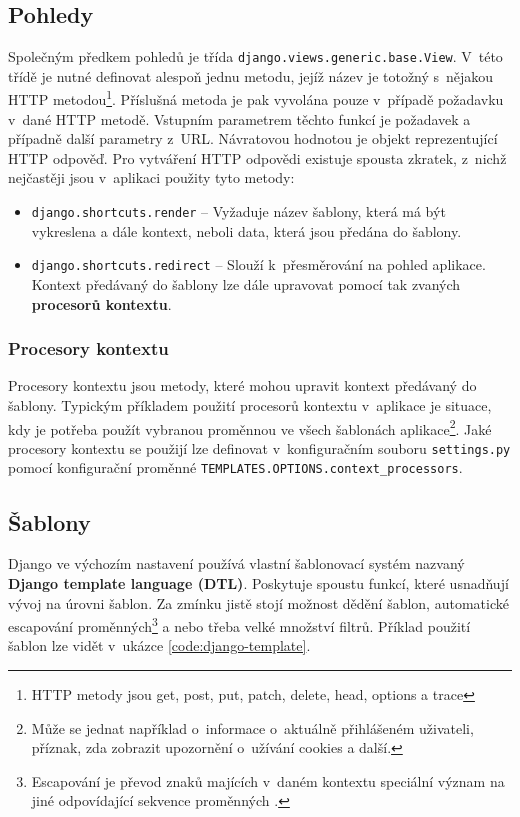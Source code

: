 \subsection{Pohledy}
Společným předkem pohledů je třída \texttt{django.views.generic.base.View}. V~této třídě je nutné definovat alespoň jednu metodu, jejíž název je totožný s~nějakou HTTP metodou\footnote{HTTP metody jsou get, post, put, patch, delete, head, options a trace}. Příslušná metoda je pak vyvolána pouze v~případě požadavku v~dané HTTP metodě. Vstupním parametrem těchto funkcí je požadavek a případně další parametry z~URL. Návratovou hodnotou je objekt reprezentující HTTP odpověď. Pro vytváření HTTP odpovědi existuje spousta zkratek, z~nichž nejčastěji jsou v~aplikaci použity tyto metody:
\begin{itemize}
    \item \texttt{django.shortcuts.render} -- Vyžaduje název šablony, která má být vykreslena a dále kontext, neboli data, která jsou předána do šablony.
    \item \texttt{django.shortcuts.redirect} -- Slouží k~přesměrování na pohled aplikace. Kontext předávaný do šablony lze dále upravovat pomocí tak zvaných \textbf{procesorů kontextu}.
\end{itemize}

\subsubsection{Procesory kontextu}
\begin{sloppypar}
Procesory kontextu jsou metody, které mohou upravit kontext předávaný do šablony. Typickým příkladem použití procesorů kontextu v~aplikace je situace, kdy je potřeba použít vybranou proměnnou ve všech šablonách aplikace\footnote{Může se jednat například o~informace o~aktuálně přihlášeném uživateli, příznak, zda zobrazit upozornění o~užívání cookies a další.}. Jaké procesory kontextu se použijí lze definovat v~konfiguračním souboru \texttt{settings.py} pomocí konfigurační proměnné \texttt{TEMPLATES.OPTIONS.context\_processors}.
\end{sloppypar}


\subsection{Šablony}
Django ve výchozím nastavení používá vlastní šablonovací systém nazvaný \textbf{Django template language (DTL)}. Poskytuje spoustu funkcí, které usnadňují vývoj na úrovni šablon. Za zmínku jistě stojí možnost dědění šablon, automatické escapování proměnných\footnote{Escapování je převod znaků majících v~daném kontextu speciální význam na jiné odpovídající sekvence proměnných \cite{escape}.} a nebo třeba velké množství filtrů. Příklad použití šablon lze vidět v~ukázce \ref{code:django-template}.

